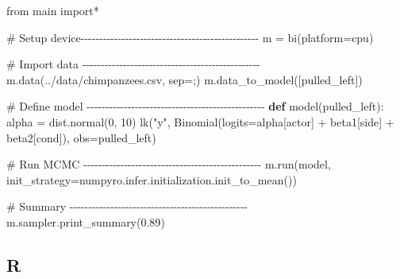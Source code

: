 \documentclass[
  letterpaper,
  DIV=11,
  numbers=noendperiod]{scrreprt}
\newenvironment{Shaded}{\begin{snugshade}}{\end{snugshade}}
\newcommand{\CommentTok}[1]{\textcolor[rgb]{0.37,0.37,0.37}{#1}}
\newcommand{\DecValTok}[1]{\textcolor[rgb]{0.68,0.00,0.00}{#1}}
\newcommand{\FloatTok}[1]{\textcolor[rgb]{0.68,0.00,0.00}{#1}}
\newcommand{\ImportTok}[1]{\textcolor[rgb]{0.00,0.46,0.62}{#1}}
\newcommand{\KeywordTok}[1]{\textcolor[rgb]{0.00,0.23,0.31}{\textbf{#1}}}
\newcommand{\NormalTok}[1]{\textcolor[rgb]{0.00,0.23,0.31}{#1}}
\newcommand{\OperatorTok}[1]{\textcolor[rgb]{0.37,0.37,0.37}{#1}}
\newcommand{\StringTok}[1]{\textcolor[rgb]{0.13,0.47,0.30}{#1}}
\begin{document}
\begin{Shaded}
\begin{Highlighting}[]
\ImportTok{from}\NormalTok{ main }\ImportTok{import}\OperatorTok{*}

\CommentTok{\# Setup device{-}{-}{-}{-}{-}{-}{-}{-}{-}{-}{-}{-}{-}{-}{-}{-}{-}{-}{-}{-}{-}{-}{-}{-}{-}{-}{-}{-}{-}{-}{-}{-}{-}{-}{-}{-}{-}{-}{-}{-}{-}{-}{-}{-}{-}{-}{-}{-}}
\NormalTok{m }\OperatorTok{=}\NormalTok{ bi(platform}\OperatorTok{=}\StringTok{\textquotesingle{}cpu\textquotesingle{}}\NormalTok{)}

\CommentTok{\# Import data {-}{-}{-}{-}{-}{-}{-}{-}{-}{-}{-}{-}{-}{-}{-}{-}{-}{-}{-}{-}{-}{-}{-}{-}{-}{-}{-}{-}{-}{-}{-}{-}{-}{-}{-}{-}{-}{-}{-}{-}{-}{-}{-}{-}{-}{-}{-}{-}}
\NormalTok{m.data(}\StringTok{\textquotesingle{}../data/chimpanzees.csv\textquotesingle{}}\NormalTok{, sep}\OperatorTok{=}\StringTok{\textquotesingle{};\textquotesingle{}}\NormalTok{) }
\NormalTok{m.data\_to\_model([}\StringTok{\textquotesingle{}pulled\_left\textquotesingle{}}\NormalTok{])}

\CommentTok{\# Define model {-}{-}{-}{-}{-}{-}{-}{-}{-}{-}{-}{-}{-}{-}{-}{-}{-}{-}{-}{-}{-}{-}{-}{-}{-}{-}{-}{-}{-}{-}{-}{-}{-}{-}{-}{-}{-}{-}{-}{-}{-}{-}{-}{-}{-}{-}{-}{-}}
\KeywordTok{def}\NormalTok{ model(pulled\_left):}
\NormalTok{    alpha }\OperatorTok{=}\NormalTok{ dist.normal(}\DecValTok{0}\NormalTok{, }\DecValTok{10}\NormalTok{)}
\NormalTok{    lk(}\StringTok{"y"}\NormalTok{, Binomial(logits}\OperatorTok{=}\NormalTok{alpha[actor] }\OperatorTok{+}\NormalTok{ beta1[side] }\OperatorTok{+}\NormalTok{ beta2[cond]), obs}\OperatorTok{=}\NormalTok{pulled\_left)}

\CommentTok{\# Run MCMC {-}{-}{-}{-}{-}{-}{-}{-}{-}{-}{-}{-}{-}{-}{-}{-}{-}{-}{-}{-}{-}{-}{-}{-}{-}{-}{-}{-}{-}{-}{-}{-}{-}{-}{-}{-}{-}{-}{-}{-}{-}{-}{-}{-}{-}{-}{-}{-}}
\NormalTok{m.run(model, init\_strategy}\OperatorTok{=}\NormalTok{numpyro.infer.initialization.init\_to\_mean()) }

\CommentTok{\# Summary {-}{-}{-}{-}{-}{-}{-}{-}{-}{-}{-}{-}{-}{-}{-}{-}{-}{-}{-}{-}{-}{-}{-}{-}{-}{-}{-}{-}{-}{-}{-}{-}{-}{-}{-}{-}{-}{-}{-}{-}{-}{-}{-}{-}{-}{-}{-}{-}}
\NormalTok{m.sampler.print\_summary(}\FloatTok{0.89}\NormalTok{)}
\end{Highlighting}
\end{Shaded}

\subsection{R}
\end{document}
